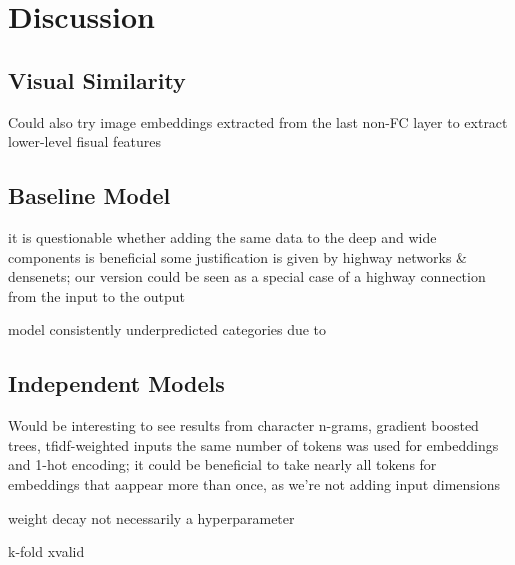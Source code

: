 \chapter{Discussion}

\section{Visual Similarity}

Could also try image embeddings extracted from the last non-FC layer to extract lower-level fisual features

\section{Baseline Model}

it is questionable whether adding the same data to the deep and wide components is beneficial
  some justification is given by highway networks \& densenets; our version could be seen as a special case of a highway connection from the input to the output

model consistently underpredicted categories due to

\section{Independent Models}

Would be interesting to see results from character n-grams, gradient boosted trees, tfidf-weighted inputs
the same number of tokens was used for embeddings and 1-hot encoding; it could be beneficial to take nearly all tokens for embeddings that aappear more than once, as we're not adding input dimensions

weight decay not necessarily a hyperparameter

k-fold xvalid
